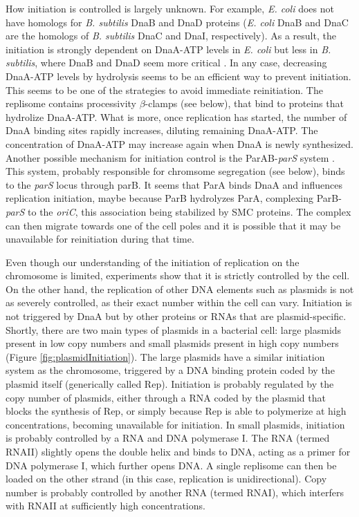 How initiation is controlled is largely unknown. For example, \textit{E. coli} does not have homologs for \textit{B. subtilis} DnaB and DnaD proteins (\textit{E. coli} DnaB and DnaC are the homologs of \textit{B. subtilis} DnaC and DnaI, respectively). As a result, the initiation is strongly dependent on DnaA-ATP levels in \textit{E. coli} but less in \textit{B. subtilis}, where DnaB and DnaD seem more critical \citep{briggs_chromosomal_2012}. In any case, decreasing DnaA-ATP levels by hydrolysis seems to be an efficient way to prevent initiation. This seems to be one of the strategies to avoid immediate reinitiation. The replisome contains processivity $\beta$-clamps (see below), that bind to proteins that hydrolize DnaA-ATP. What is more, once replication has started, the number of DnaA binding sites rapidly increases, diluting remaining DnaA-ATP. The concentration of DnaA-ATP may increase again when DnaA is newly synthesized. Another possible mechanism for initiation control is the ParAB-\textit{parS} system \citep{reyes-lamothe_chromosome_2012}. This system, probably responsible for chromsome segregation (see below), binds to the \textit{parS} locus through parB. It seems that ParA binds DnaA and influences replication initiation, maybe because ParB hydrolyzes ParA, complexing ParB-\textit{parS} to the \textit{oriC}, this association being stabilized by SMC proteins. The complex can then migrate towards one of the cell poles and it is possible that it may be unavailable for reinitiation during that time.

Even though our understanding of the initiation of replication on the chromosome is limited, experiments show that it is strictly controlled by the cell. On the other hand, the replication of other DNA elements such as plasmids is not as severely controlled, as their exact number within the cell can vary. Initiation is not triggered by DnaA but by other proteins or RNAs that are plasmid-specific. Shortly, there are two main types of plasmids in a bacterial cell: large plasmids present in low copy numbers and small plasmids present in high copy numbers (Figure \ref{fig:plasmidInitiation}). The large plasmids have a similar initiation system as the chromosome, triggered by a DNA binding protein coded by the plasmid itself (generically called Rep). Initiation is probably regulated by the copy number of plasmids, either through a RNA coded by the plasmid that blocks the synthesis of Rep, or simply because Rep is able to polymerize at high concentrations, becoming unavailable for initiation. In small plasmids, initiation is probably controlled by a RNA and DNA polymerase I. The RNA (termed RNAII) slightly opens the double helix and binds to DNA, acting as a primer for DNA polymerase I, which further opens DNA. A single replisome can then be loaded on the other strand (in this case, replication is unidirectional). Copy number is probably controlled by another RNA (termed RNAI), which interfers with RNAII at sufficiently high concentrations.

